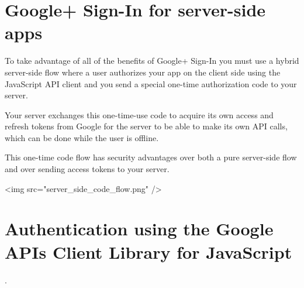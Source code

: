 
\section{Google+ Sign-In for server-side apps}

To take advantage of all of the benefits of Google+ Sign-In you must
use a hybrid server-side flow where a user authorizes your app on the
client side using the JavaScript API client and you send a
special one-time authorization code to your server. 

Your server exchanges this one-time-use code to acquire its own access and
refresh tokens from Google for the server to be able to make its own API
calls, which can be done while the user is offline. 

This one-time code flow has security advantages over both a pure
server-side flow and over sending access tokens to your server.


\begin{rawhtml}
<img src="server_side_code_flow.png" />
\end{rawhtml}

\section{Authentication using the Google APIs Client Library for JavaScript}

.

